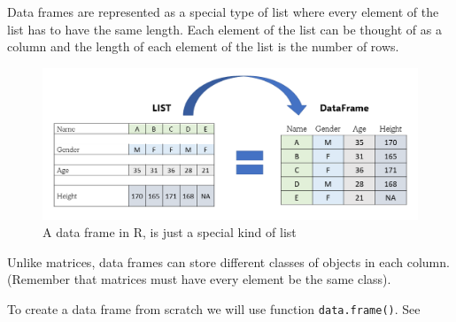 \documentclass[
]{book}
\begin{document}
Data frames are represented as a special type of list where every element of the list has to have the same length. Each element of the list can be thought of as a column and the length of each element of the list is the number of rows.

\begin{figure}

{\centering \includegraphics[width=0.99\linewidth]{images/list_vs_df} 

}

\caption{A data frame in R, is just a special kind of list}\label{fig:listvsdf}
\end{figure}

Unlike matrices, data frames can store different classes of objects in each column. (Remember that matrices must have every element be the same class).

To create a data frame from scratch we will use function \texttt{data.frame()}. See
\end{document}

